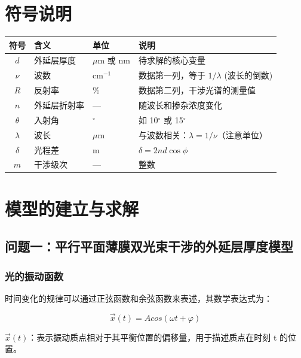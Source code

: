 \documentclass[withoutpreface,bwprint]{cumcmthesis} %
\begin{document}
\section{符号说明}

\begin{center}
    \begin{tabular}{clll}
        \toprule
        符号        & 含义     & 单位          & 说明                            \\
        \midrule
        $d$       & 外延层厚度  & $\mu$m 或 nm & 待求解的核心变量                      \\
        $\nu$     & 波数     & cm$^{-1}$   & 数据第一列，等于 $1/\lambda$ (波长的倒数)  \\
        $R$       & 反射率    & \%          & 数据第二列，干涉光谱的测量值                \\
        $n$       & 外延层折射率 & —           & 随波长和掺杂浓度变化                    \\
        $\theta$  & 入射角    & $^\circ$    & 如 10$^\circ$ 或 15$^\circ$     \\
        $\lambda$ & 波长     & $\mu$m      & 与波数相关：$\lambda = 1/\nu$（注意单位） \\
        $\delta$  & 光程差    & m           & $\delta = 2 n d \cos \phi$    \\
        $m$       & 干涉级次   & —           & 整数                            \\
        \bottomrule
    \end{tabular}
\end{center}


\section{模型的建立与求解}

\subsection{问题一：平行平面薄膜双光束干涉的外延层厚度模型}

\subsubsection{光的振动函数}
时间变化的规律可以通过正弦函数和余弦函数来表述，其数学表达式为：

\[\overrightarrow{x}(t) = Acos(\omega t + \varphi)\]

\(\overrightarrow{x}(t)\)：表示振动质点相对于其平衡位置的偏移量，用于描述质点在时刻 t 的位置。
\end{document}

